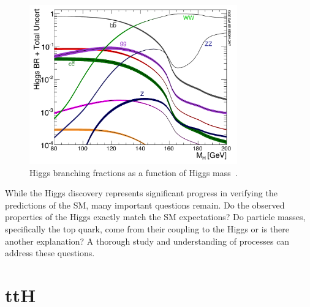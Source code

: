 \begin{figure}[hbtp]
 \begin{center}
   \includegraphics[width=0.8\textwidth]{ch2_figs/higgs_decay.pdf}
   \caption{Higgs branching fractions as a function of Higgs mass~\cite{lhchxswg}.}
   \label{fig:higgs_decay}
 \end{center}
\end{figure}

While the Higgs discovery represents significant progress in verifying the predictions of the SM, many important questions remain. Do the observed properties
of the Higgs exactly match the SM expectations? Do particle masses, specifically the top quark, come from their coupling to the Higgs or is there another
explanation? A thorough study and understanding of \tth processes can address these questions.  

\section{ttH}


